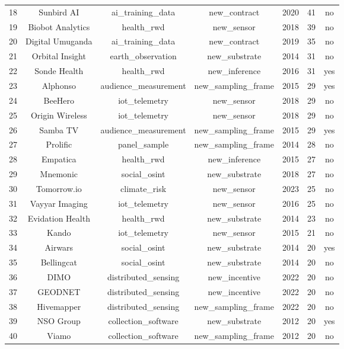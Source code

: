 \begin{table}[!htbp]
\begin{tabular}{@{\extracolsep{5pt}} ccccccc}
18 & Sunbird AI & ai\_training\_data & new\_contract & 2020 & 41 & no \\ 
19 & Biobot Analytics & health\_rwd & new\_sensor & 2018 & 39 & no \\ 
20 & Digital Umuganda & ai\_training\_data & new\_contract & 2019 & 35 & no \\ 
21 & Orbital Insight & earth\_observation & new\_substrate & 2014 & 31 & no \\ 
22 & Sonde Health & health\_rwd & new\_inference & 2016 & 31 & yes \\ 
23 & Alphonso & audience\_measurement & new\_sampling\_frame & 2015 & 29 & yes \\ 
24 & BeeHero & iot\_telemetry & new\_sensor & 2018 & 29 & no \\ 
25 & Origin Wireless & iot\_telemetry & new\_sensor & 2018 & 29 & no \\ 
26 & Samba TV & audience\_measurement & new\_sampling\_frame & 2015 & 29 & yes \\ 
27 & Prolific & panel\_sample & new\_sampling\_frame & 2014 & 28 & no \\ 
28 & Empatica & health\_rwd & new\_inference & 2015 & 27 & no \\ 
29 & Mnemonic & social\_osint & new\_substrate & 2018 & 27 & no \\ 
30 & Tomorrow.io & climate\_risk & new\_sensor & 2023 & 25 & no \\ 
31 & Vayyar Imaging & iot\_telemetry & new\_sensor & 2016 & 25 & no \\ 
32 & Evidation Health & health\_rwd & new\_substrate & 2014 & 23 & no \\ 
33 & Kando & iot\_telemetry & new\_sensor & 2015 & 21 & no \\ 
34 & Airwars & social\_osint & new\_substrate & 2014 & 20 & yes \\ 
35 & Bellingcat & social\_osint & new\_substrate & 2014 & 20 & no \\ 
36 & DIMO & distributed\_sensing & new\_incentive & 2022 & 20 & no \\ 
37 & GEODNET & distributed\_sensing & new\_incentive & 2022 & 20 & no \\ 
38 & Hivemapper & distributed\_sensing & new\_sampling\_frame & 2022 & 20 & no \\ 
39 & NSO Group & collection\_software & new\_substrate & 2012 & 20 & yes \\ 
40 & Viamo & collection\_software & new\_sampling\_frame & 2012 & 20 & no \\ 

\end{tabular}
\end{table}
